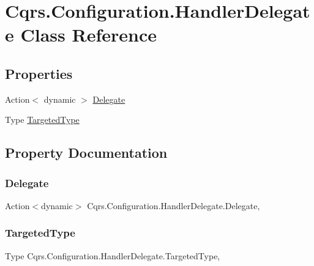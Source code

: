 \hypertarget{classCqrs_1_1Configuration_1_1HandlerDelegate}{}\section{Cqrs.\+Configuration.\+Handler\+Delegate Class Reference}
\label{classCqrs_1_1Configuration_1_1HandlerDelegate}
\subsection*{Properties}
\begin{DoxyCompactItemize}
\item 
Action$<$ dynamic $>$ \hyperlink{classCqrs_1_1Configuration_1_1HandlerDelegate_a67fe9f218e3202af02319f33483edb20_a67fe9f218e3202af02319f33483edb20}{Delegate}
\item 
Type \hyperlink{classCqrs_1_1Configuration_1_1HandlerDelegate_ac88ee4620ae81fa214a562be2ce867f1_ac88ee4620ae81fa214a562be2ce867f1}{Targeted\+Type}
\end{DoxyCompactItemize}


\subsection{Property Documentation}
\mbox{\label{classCqrs_1_1Configuration_1_1HandlerDelegate_a67fe9f218e3202af02319f33483edb20_a67fe9f218e3202af02319f33483edb20}} 
\subsubsection{\texorpdfstring{Delegate}{Delegate}}
{\footnotesize\ttfamily Action$<$dynamic$>$ Cqrs.\+Configuration.\+Handler\+Delegate.\+Delegate\hspace{0.3cm}{\ttfamily [get]}, {\ttfamily [set]}}

\mbox{\label{classCqrs_1_1Configuration_1_1HandlerDelegate_ac88ee4620ae81fa214a562be2ce867f1_ac88ee4620ae81fa214a562be2ce867f1}} 
\subsubsection{\texorpdfstring{Targeted\+Type}{TargetedType}}
{\footnotesize\ttfamily Type Cqrs.\+Configuration.\+Handler\+Delegate.\+Targeted\+Type\hspace{0.3cm}{\ttfamily [get]}, {\ttfamily [set]}}

